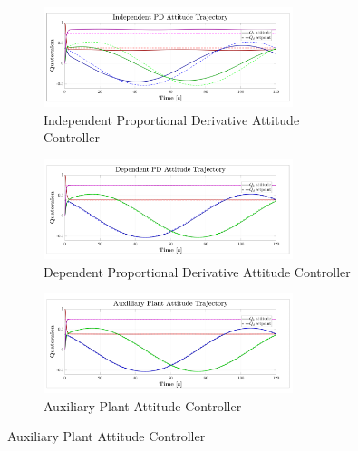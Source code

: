 \begin{figure}[hbtp]
\vspace{-10pt}
\begin{subfigure}{\textwidth}
\centering
\includegraphics[width=0.8\textwidth]{graphs/PD_Diagonal_Independent_Trajectory}
\vspace{-11pt}
\caption{Independent Proportional Derivative Attitude Controller}
\label{fig:independent_diagonal_trjaectory}
\end{subfigure}
\begin{subfigure}{\textwidth}
\vspace{-3pt}
\centering
\includegraphics[width=0.8\textwidth]{graphs/PD_Diagonal_Dependent_Trajectory}
\vspace{-11pt}
\caption{Dependent Proportional Derivative Attitude Controller}
\end{subfigure}
\begin{subfigure}{\textwidth}
\vspace{-3pt}
\centering
\includegraphics[width=0.8\textwidth]{graphs/XPD_Trajectory}
\vspace{-11pt}
\caption{Auxiliary Plant Attitude Controller}
\end{subfigure}
\vspace{-24pt}
\end{figure}

